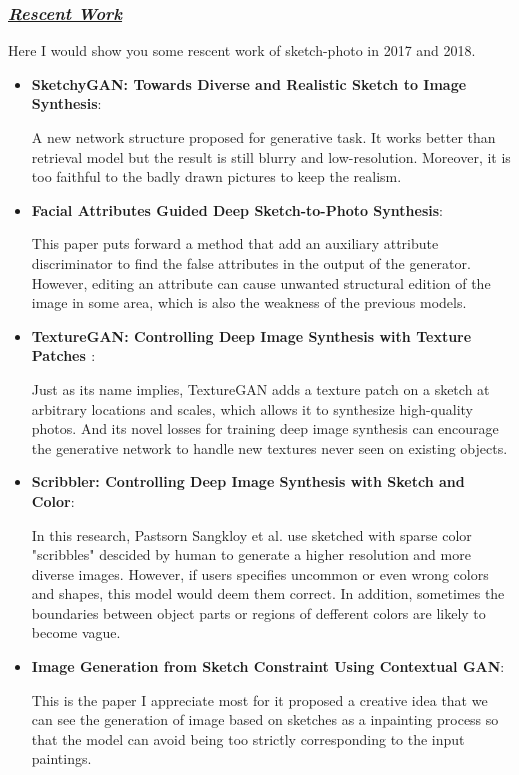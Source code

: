 \documentclass{article}
\begin{document}
\subsubsection{\underline{\textbf{\emph{Rescent Work}}}}
\indent Here I would show you some rescent work of sketch-photo in 2017 and 2018.
\begin{itemize}
\item \textbf{SketchyGAN: Towards Diverse and Realistic Sketch to Image Synthesis\cite{Chen2018SketchyGAN}}: \par
A new network structure proposed for generative task. It works better than retrieval model but the result is still blurry and low-resolution. Moreover, it is too faithful to the badly drawn pictures to keep the realism.

\item \textbf{Facial Attributes Guided Deep Sketch-to-Photo Synthesis\cite{Kazemi2018Facial}}: \par
This paper puts forward a method that add an auxiliary attribute discriminator to find the false attributes in the output of the generator. However, editing an attribute can cause unwanted structural edition of the image in some area, which is also the weakness of the previous models.

\item \textbf{TextureGAN: Controlling Deep Image Synthesis with Texture Patches \cite{Xian2017TextureGAN}}: \par
Just as its name implies, TextureGAN adds a texture patch on a sketch at arbitrary locations and scales, which allows it to synthesize high-quality photos. And its novel losses for training deep image synthesis can encourage the generative network to handle new textures never seen on existing objects.

\item \textbf{Scribbler: Controlling Deep Image Synthesis with Sketch and Color\cite{Sangkloy2016Scribbler}}: \par
In this research, Pastsorn Sangkloy et al. use sketched with sparse color "scribbles" descided by human to generate a higher resolution and more diverse images. However, if users specifies uncommon or even wrong colors and shapes, this model would deem them correct. In addition, sometimes the boundaries between object parts or regions of defferent colors are likely to become vague.


\item \textbf{Image Generation from Sketch Constraint Using Contextual GAN\cite{Lu2017Image}}: \par
This is the paper I appreciate most for it proposed a creative idea that we can see the generation of image based on sketches as a inpainting process so that the model can avoid being too strictly corresponding to the input paintings. 


\end{itemize}
\end{document}
